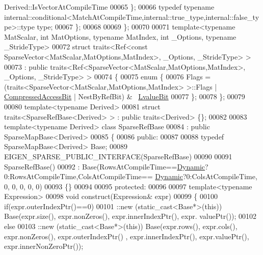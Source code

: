 \begin{DoxyCode}
      Derived::IsVectorAtCompileTime
00065     \};
00066     \textcolor{keyword}{typedef} \textcolor{keyword}{typename} 
      internal::conditional<MatchAtCompileTime,internal::true\_type,internal::false\_type>::type type;
00067   \};
00068 
00069 \};
00070 
00071 \textcolor{keyword}{template}<\textcolor{keyword}{typename} MatScalar, \textcolor{keywordtype}{int} MatOptions, \textcolor{keyword}{typename} MatIndex, \textcolor{keywordtype}{int} \_Options, \textcolor{keyword}{typename} \_Str\textcolor{keywordtype}{id}eType>
00072 \textcolor{keyword}{struct }traits<Ref<const SparseVector<MatScalar,MatOptions,MatIndex>, \_Options, \_StrideType> >
00073   : \textcolor{keyword}{public} traits<Ref<SparseVector<MatScalar,MatOptions,MatIndex>, \_Options, \_StrideType> >
00074 \{
00075   \textcolor{keyword}{enum} \{
00076     Flags = (traits<SparseVector<MatScalar,MatOptions,MatIndex> >::Flags | 
      \hyperlink{group__flags_gaed0244284da47a2b8661261431173caf}{CompressedAccessBit} | NestByRefBit) & ~\hyperlink{group__flags_gae2c323957f20dfdc6cb8f44428eaec1a}{LvalueBit}
00077   \};
00078 \};
00079 
00080 \textcolor{keyword}{template}<\textcolor{keyword}{typename} Derived>
00081 \textcolor{keyword}{struct }traits<SparseRefBase<Derived> > : \textcolor{keyword}{public} traits<Derived> \{\};
00082 
00083 \textcolor{keyword}{template}<\textcolor{keyword}{typename} Derived> \textcolor{keyword}{class }SparseRefBase
00084   : \textcolor{keyword}{public} SparseMapBase<Derived>
00085 \{
00086 \textcolor{keyword}{public}:
00087 
00088   \textcolor{keyword}{typedef} SparseMapBase<Derived> Base;
00089   EIGEN\_SPARSE\_PUBLIC\_INTERFACE(SparseRefBase)
00090 
00091   SparseRefBase()
00092     : Base(RowsAtCompileTime==\hyperlink{namespace_eigen_ad81fa7195215a0ce30017dfac309f0b2}{Dynamic}?0:RowsAtCompileTime,ColsAtCompileTime==
      \hyperlink{namespace_eigen_ad81fa7195215a0ce30017dfac309f0b2}{Dynamic}?0:ColsAtCompileTime, 0, 0, 0, 0, 0)
00093   \{\}
00094   
00095 \textcolor{keyword}{protected}:
00096 
00097   \textcolor{keyword}{template}<\textcolor{keyword}{typename} Expression>
00098   \textcolor{keywordtype}{void} construct(Expression& expr)
00099   \{
00100     \textcolor{keywordflow}{if}(expr.outerIndexPtr()==0)
00101       ::\textcolor{keyword}{new} (static\_cast<Base*>(\textcolor{keyword}{this})) Base(expr.size(), expr.nonZeros(), expr.innerIndexPtr(), expr.
      valuePtr());
00102     else
00103       ::new (static\_cast<Base*>(\textcolor{keyword}{this})) Base(expr.rows(), expr.cols(), expr.nonZeros(), expr.outerIndexPtr()
      , expr.innerIndexPtr(), expr.valuePtr(), expr.innerNonZeroPtr());

\end{DoxyCode}
